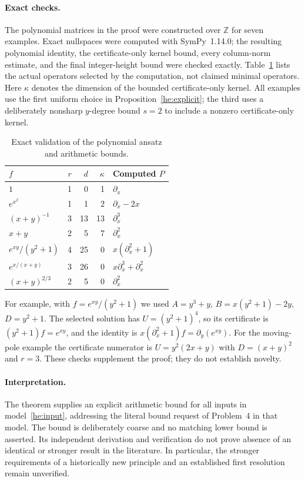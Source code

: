 \documentclass[11pt,a4paper]{article}
\theoremstyle{remark}\newtheorem{remark}[theorem]{Remark}
\begin{document}
\paragraph{Exact checks.}
The polynomial matrices in the proof were constructed over $\mathbb Z$
for seven examples. Exact nullspaces were computed with SymPy~1.14.0;
the resulting polynomial identity, the certificate-only kernel bound,
every column-norm estimate, and the final integer-height bound were
checked exactly. Table~\ref{he:validation} lists the actual operators
selected by the computation, not claimed minimal operators. Here
$\kappa$ denotes the dimension of the bounded certificate-only kernel.
All examples use the first uniform choice in
Proposition~\ref{he:explicit}; the third uses a deliberately nonsharp
$y$-degree bound $s=2$ to include a nonzero certificate-only kernel.

\begin{table}[htbp]
\centering
\small
\begin{tabular}{lrrrl}
\hline
$f$ & $r$ & $d$ & $\kappa$ & Computed $P$\\
\hline
$1$ &1&0&1&$\partial_x$\\
$e^{x^2}$ &1&1&2&$\partial_x-2x$\\
$(x+y)^{-1}$ &3&13&13&$\partial_x^3$\\
$x+y$ &2&5&7&$\partial_x^2$\\
$e^{xy}/(y^2+1)$ &4&25&0&$x(\partial_x^2+1)$\\
$e^{x/(x+y)}$ &3&26&0&$x\partial_x^3+\partial_x^2$\\
$(x+y)^{2/3}$ &2&5&0&$\partial_x^2$\\
\hline
\end{tabular}
\caption{Exact validation of the polynomial ansatz and arithmetic bounds.}
\label{he:validation}
\end{table}

For example, with $f=e^{xy}/(y^2+1)$ we used
$A=y^3+y$, $B=x(y^2+1)-2y$, $D=y^2+1$.
The selected solution has $U=(y^2+1)^4$, so its certificate is
$(y^2+1)f=e^{xy}$, and the identity is
$x(\partial_x^2+1)f=\partial_y(e^{xy})$.
For the moving-pole example the certificate numerator is
$U=y^2(2x+y)$ with $D=(x+y)^2$ and $r=3$.
These checks supplement the proof; they do not establish novelty.

\paragraph{Interpretation.}
The theorem supplies an explicit arithmetic bound for all inputs in
model~\eqref{he:input}, addressing the literal bound request of
Problem~4 in that model. The bound is deliberately coarse and no matching
lower bound is asserted. Its independent derivation and verification do
not prove absence of an identical or stronger result in the literature.
In particular, the stronger requirements of a historically new principle
and an established first resolution remain unverified.
\end{document}

